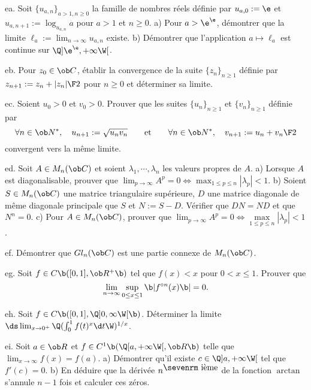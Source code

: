 \exo [Level=1,Fight=2,Learn=2,Type=\Exercices,Field=\DéveloppementsLimités,Origin=] ea. 
Soit $\{u_{a,n}\}_{a>1,n\ge0}$ 
la famille de nombres réels définie par $u_{a,0}:=\e$ et 
$u_{a,n+1}:=\log_{u_{a,n}}a$ pour $a>1$ et $n\ge0$. \pn
a) Pour $a>\e^\e$, démontrer que la limite $\ell_a:=\lim_{n\to\infty}u_{a,n}$ existe. \pn
b) Démontrer que l'application $a\mapsto \ell_a$ est continue sur $\Q]\e^\e,+\infty\W[$. 

\exo [Origin=,Level=1,Fight=1,Learn=2,Type=\Colles,Field=\Suites] eb. Pour $z_0\in\ob C$, établir la convergence de 
la suite $\{z_n\}_{n\ge1}$ définie par $z_{n+1}:={z_n+|z_n|\F2}$ pour $n\ge0$ 
et déterminer sa limite. 

\exo [Origin=,Level=1,Fight=2,Learn=2,Type=\Exercices,Field=\Suites]  ec. Soient $u_0>0$ et $v_0>0$.  
Prouver que les suites $\{u_n\}_{n\ge1}$ et $\{v_n\}_{n\ge1}$ 
définie par 
$$
\forall n\in\ob N^*,\quad u_{n+1}:=\sqrt{u_nv_n}\qquad\hbox{et}\qquad\forall n\in\ob N^*, \quad 
v_{n+1}:={u_n+v_n\F2}
$$ 
convergent vers la même limite.

\exo [Level=2,Fight=1,Learn=1,Type=\Colles,Field=\Diagonalisation,Origin=] ed. 
Soit $A\in\sc M_n(\ob C)$ et soient $\lambda_1,\cdots,\lambda_n$ les valeurs propres de $A$. \pn 
a) Lorsque $A$ est diagonalisable, 
prouver que $\lim_{p\to\infty}A^p=0\Longleftrightarrow \max_{1\le p\le n}|\lambda_p|<1$. \pn 
b) Soient $S\in\sc M_n(\ob C)$ une matrice triangulaire supérieure, 
$D$ une matrice diagonale de même diagonale principale que $S$ et $N:=S-D$. 
Vérifier que $DN=ND$ et que $N^n=0$. \pn
c) Pour $A\in\sc M_n(\ob C)$, prouver 
que $\lim_{p\to\infty}A^p=0\Longleftrightarrow \max\limits_{1\le p\le n}|\lambda_p|<1$.  

\exo [Level=2,Fight=1,Learn=1,Type=\Others,Field=\Connexité,Origin=] ef. 
Démontrer que $\sc Gl_n(\ob C)$ est une partie connexe de $\sc M_n(\ob C)$. 

\exo [Origin=,Level=1,Fight=2,Learn=1,Type=\Others,Field=\Continuité] eg. 
Soit $f\in\sc C\b([0,1],\ob R^+\b)$ tel que $f(x)<x$ pour $0<x\le 1$. 
Prouver que $$
\lim\limits_{n\to\infty}\sup\limits_{0\le x\le 1}\b|f^{\circ n}(x)\b|=0.
$$ 

\exo [Level=1,Fight=3,Learn=1,Type=\Colles,Field=\Continuité,Origin=] eh. 
Soit $f\in\sc C\b([0,1],\Q]0,\infty\W[\b)$. Déterminer la limite $\ds \lim_{x\to0^+}\Q(\int_0^1f(t)^x\d t\W)^{1/x}$. 

\exo [Level=1,Fight=2,Learn=2,Type=\TravauxDirigés,Field=\ThéorèmeDeRolle,Origin=] ei. 
Soit $a\in\ob R$ et $f\in\sc C^1\b(\Q[a,+\infty\W[,\ob R\b)$ telle que $\lim_{x\to\infty}f(x)=f(a)$. \pn
a) Démontrer qu'il existe $c\in\Q]a,+\infty\W[$ tel que $f'(c)=0$. \pn
b) En déduire que la dérivée $n^{\hbox{\sevenrm ième}}$ de la fonction $\arctan$ 
s'annule $n-1$ fois et calculer ces zéros. 

